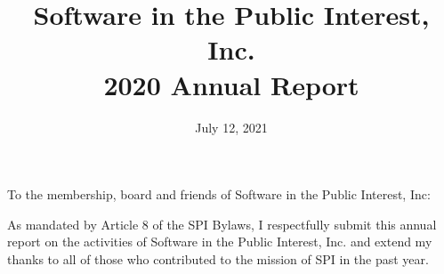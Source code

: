 \documentclass[a4paper]{report}
\begin{document}
\title{Software in the Public Interest, Inc.\\
2020 Annual Report}
\date{July 12, 2021}

\maketitle

\newpage


\hspace{1em}

To the membership, board and friends of Software in the Public Interest, Inc:

As mandated by Article 8 of the SPI Bylaws, I respectfully submit this annual report on the activities of Software in the Public Interest, Inc. and extend my thanks to all of those who contributed to the mission of SPI in the past year.
\end{document}
